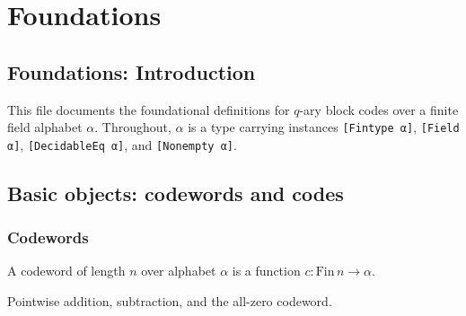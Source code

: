 \section{Foundations}
\subsection*{Foundations: Introduction}

This file documents the foundational definitions for $q$-ary block codes over a finite field
alphabet $\alpha$.  Throughout, $\alpha$ is a type carrying instances
\texttt{[Fintype α]}, \texttt{[Field α]}, \texttt{[DecidableEq α]}, and \texttt{[Nonempty α]}.

\subsection{Basic objects: codewords and codes}

\subsubsection{Codewords}

\begin{definition}[Codeword]
\label{ErrorCorrectingCodes.Codeword}
\leanok
{}
A codeword of length $n$ over alphabet $\alpha$ is a function $c : \mathrm{Fin}\,n \to \alpha$.
\end{definition}

\begin{definition}
\label{ErrorCorrectingCodes.Codeword.add}
\label{ErrorCorrectingCodes.Codeword.sub}
\label{ErrorCorrectingCodes.Codeword.zero}
\leanok
{}
Pointwise addition, subtraction, and the all-zero codeword.
\end{definition}

